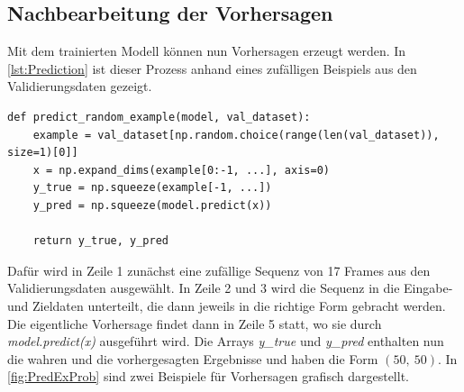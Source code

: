 \subsection{Nachbearbeitung der Vorhersagen}
\label{sec:Nachbearbeitung}
Mit dem trainierten Modell können nun Vorhersagen erzeugt werden.
In \autoref{lst:Prediction} ist dieser Prozess anhand eines zufälligen Beispiels aus den Validierungsdaten gezeigt.

\begin{minipage}{\textwidth}
\begin{code}
\begin{verbatim}
def predict_random_example(model, val_dataset):
    example = val_dataset[np.random.choice(range(len(val_dataset)), size=1)[0]]
    x = np.expand_dims(example[0:-1, ...], axis=0)
    y_true = np.squeeze(example[-1, ...])
    y_pred = np.squeeze(model.predict(x))

    return y_true, y_pred
\end{verbatim}
\label{lst:Prediction}
\end{code}
\end{minipage}

Dafür wird in Zeile 1 zunächst eine zufällige Sequenz von 17 Frames aus den Validierungsdaten ausgewählt.
In Zeile 2 und 3 wird die Sequenz in die Eingabe- und Zieldaten unterteilt, die dann jeweils in die richtige Form gebracht werden.
Die eigentliche Vorhersage findet dann in Zeile 5 statt, wo sie durch \emph{model.predict(x)} ausgeführt wird.
Die Arrays \emph{y\_true} und \emph{y\_pred} enthalten nun die wahren und die vorhergesagten Ergebnisse und haben die Form $(50,~50)$.
In \autoref{fig:PredExProb} sind zwei Beispiele für Vorhersagen grafisch dargestellt.

